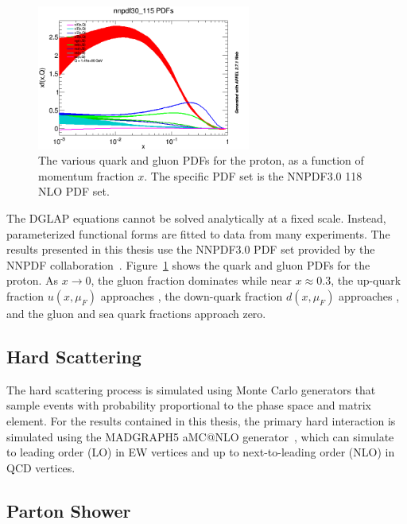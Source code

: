 \begin{figure}[htbp]
  \centering
  \includegraphics[width=0.625\textwidth]{Collider/Figures/nnpdf30_115_test.png}
  \caption{
    The various quark and gluon PDFs for the proton, as a function of momentum fraction $x$.
    The specific PDF set is the NNPDF3.0 118 NLO PDF set.
  }
  \label{fig:nnpdf}
\end{figure}

The DGLAP equations cannot be solved analytically at a fixed scale.
Instead, parameterized functional forms are fitted to data from many experiments.  
The results presented in this thesis use the NNPDF3.0 PDF set provided by the NNPDF collaboration~\cite{Ball2015}.
Figure~\ref{fig:nnpdf} shows the quark and gluon PDFs for the proton.
As $x \rightarrow 0$, the gluon fraction dominates while near $x \approx 0.3$, the up-quark fraction $u(x, \mu_F)$ approaches , the down-quark fraction $d(x, \mu_F)$ approaches , and the gluon and sea quark fractions approach zero.

\subsection{Hard Scattering}

The hard scattering process is simulated using Monte Carlo generators that sample events with probability proportional to the phase space and matrix element.
For the results contained in this thesis, the primary hard interaction is simulated using the MADGRAPH5 aMC@NLO generator~\cite{Alwall2014, Frederix2012}, which can simulate to leading order (LO) in EW vertices and up to next-to-leading order (NLO) in QCD vertices.

\subsection{Parton Shower}

